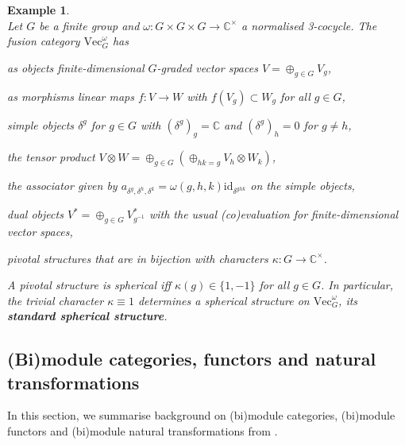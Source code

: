 \documentclass[1.5pt, a4paper]{article}
\newcommand{\C}{\mathbb{C}}
\newcommand{\inv}[0]{{-1}}
\newcommand{\oo}[0]{\otimes}
\newcommand{\id}[0]{\mathrm{id}}
\newtheorem{example}[theorem]{Example}
\begin{document}
\begin{example}\label{ex:vectgomega}\cite[Ex.~2.3.6]{EGNO}\\ Let $G$ be a finite group and $\omega: G\times G\times G\to \C^\times$ a normalised  3-cocycle. 
 The fusion category
$\mathrm{Vec}_G^\omega$ has
\begin{compactitem}
\item  as objects finite-dimensional $G$-graded vector spaces $V=\oplus_{g\in G} V_g$,
\item  as morphisms linear maps $f: V\to W$ with $f(V_g)\subset W_g$ for all $g\in G$,
\item  simple objects  $\delta^g$ for $g\in G$ with $(\delta^g)_g=\C$ and $(\delta^g)_h=0$ for $g\neq h$, 
\item  the  tensor product $V\oo W=\oplus_{g\in G}(\oplus_{hk=g} V_h\oo W_k)$, 
\item  the associator  given by $a_{\delta^g,\delta^h,\delta^k}=\omega(g,h,k) \id_{\delta^{ghk}}$ on the simple objects,  

\item dual objects $V^*=\oplus_{g\in G} V_{g^\inv}^*$ with the  usual (co)evaluation for finite-dimensional vector spaces,
\item pivotal structures that  are in bijection with characters $\kappa: G\to\C^\times$. 
 \end{compactitem}
A pivotal structure is spherical iff $\kappa(g)\in \{1,-1\}$ for all $g\in G$.
In particular, the trivial character $\kappa\equiv 1$ determines a spherical structure on  $\mathrm{Vec}_G^\omega$, its {\bf standard spherical structure}.
\end{example}




\subsection{(Bi)module categories,  functors and natural transformations}

In this section, we summarise background on (bi)module categories, (bi)module functors and (bi)module natural transformations from \cite[Ch.~7]{EGNO}.
\end{document}
